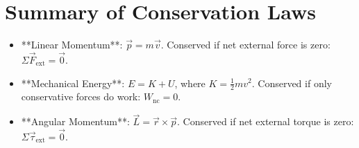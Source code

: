 \section{Summary of Conservation Laws}

\begin{formulabox}
\begin{itemize}
  \item **Linear Momentum**: $\vec{p} = m\vec{v}$. Conserved if net external force is zero: $\Sigma \vec{F}_{\text{ext}} = \vec{0}$.
  \item **Mechanical Energy**: $E = K + U$, where $K = \frac{1}{2}mv^2$. Conserved if only conservative forces do work: $W_{\text{nc}} = 0$.
  \item **Angular Momentum**: $\vec{L} = \vec{r} \times \vec{p}$. Conserved if net external torque is zero: $\Sigma \vec{\tau}_{\text{ext}} = \vec{0}$.
\end{itemize}
\end{formulabox}